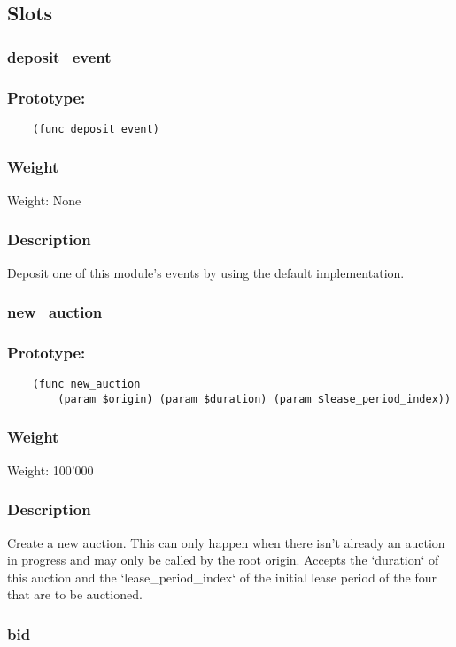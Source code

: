 \documentclass[11pt,a4paper]{article}
\begin{document}
\subsection{Slots}
\subsubsection{deposit\_event}
\subsubsection*{Prototype:}
\begin{verbatim}
    (func deposit_event)
\end{verbatim}
\subsubsection*{Weight}
Weight: None
\subsubsection*{Description}
Deposit one of this module's events by using the default implementation.

\subsubsection{new\_auction}
\subsubsection*{Prototype:}
\begin{verbatim}
    (func new_auction
        (param $origin) (param $duration) (param $lease_period_index))
\end{verbatim}
\subsubsection*{Weight}
Weight: 100'000
\subsubsection*{Description}
Create a new auction. This can only happen when there isn't already an auction in progress and may only be called by the root origin. Accepts the `duration` of this auction and the `lease\_period\_index` of the initial lease period of the four that are to be auctioned.

\subsubsection{bid}
\end{document}

